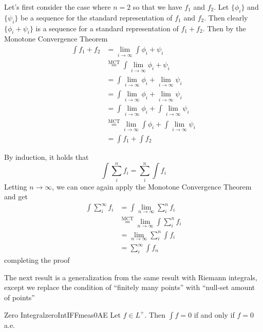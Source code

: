\documentclass[oneside]{book}
\newcommand{\rw}{\rightarrow}
\begin{document}
\begin{Proof}
	Let's first consider the case where $n = 2$ so that we have $f_1$ and $f_2$. Let $\{\phi_i\}$ and $\{\psi_i\}$ be
	a sequence for the standard representation of $f_1$ and $f_2$. Then clearly $\{\phi_i + \psi_i\}$ is a sequence for
	a standard representation of $f_1 + f_2$. Then by the Monotone Convergence Theorem
	\begin{align*}
		\int f_1 + f_2 &= \lim_{i \rw \infty} \int \phi_i + \psi_i\\
					   &\overset{\text{MCT}}{=} \int \lim_{i \rw \infty} \phi_i + \psi_i\\
					   &= \int \lim_{i \rw \infty} \phi_i +\lim_{i \rw \infty} \psi_i\\
					   &= \int \lim_{i \rw \infty} \phi_i +\lim_{i \rw \infty} \psi_i\\
					   &= \int \lim_{i \rw \infty} \phi_i +\int \lim_{i \rw \infty} \psi_i\\
					   &\overset{\text{MCT}}{=} \lim_{i \rw \infty}\int  \phi_i +\int \lim_{i \rw \infty} \psi_i\\
					   &= \int f_1 + \int f_2
	\end{align*}

	By induction, it holds that 
	\[
		\int \sum_i^n f_i = \sum_i^n \int f_i
	\]
	Letting $n \rw \infty$, we can once again apply the Monotone Convergence Theorem and get
	\begin{align*}
		\int \sum_i^\infty f_i &=\int \lim_{n \rw \infty} \sum_i^n f_i\\
							   &\overset{\text{MCT}}{=}\lim_{n \rw \infty} \int \sum_i^n f_i\\
							   &= \lim_{n \rw \infty} \sum_i^n \int f_i\\
							   &= \sum_i^\infty \int f_n
	\end{align*}
	completing the proof
\end{Proof}

The next result is a generalization from the same result with Riemann integrals, except we replace the condition of
``finitely many points'' with ``null-set amount of points''

\begin{prop}{Zero Integral}{zeroIntIFFmeas0AE}
	Let $f \in L^+$. Then $\int f = 0$ if and only if $f = 0$ a.e.
\end{prop}
\end{document}
